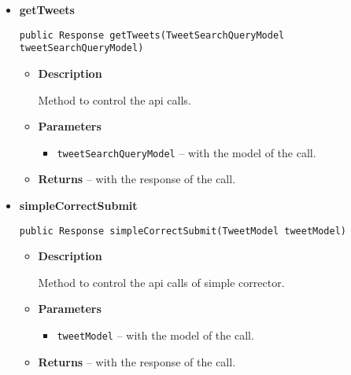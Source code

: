 {{{{{{{{{{\begin{itemize}
{\begin{itemize}
{Method to control the api calls of advanced corrector.
}
\item{
{\bf  Parameters}
  \begin{itemize}
   \item{
\texttt{tweetListModel} -- with the model of the call.}
  \end{itemize}
}%
\item{{\bf  Returns} -- 
with the response of the call. 
}%
\end{itemize}
}%
\item{ 
\hypertarget{com.jmorenov.tweetscweb.TweetCorrectorAPIController.getTweets(com.jmorenov.tweetscweb.TweetSearchQueryModel)}{{\bf  getTweets}\\}
\begin{lstlisting}[frame=none]
public Response getTweets(TweetSearchQueryModel tweetSearchQueryModel)\end{lstlisting} %
\begin{itemize}
\item{
{\bf  Description}

Method to control the api calls.
}
\item{
{\bf  Parameters}
  \begin{itemize}
   \item{
\texttt{tweetSearchQueryModel} -- with the model of the call.}
  \end{itemize}
}%
\item{{\bf  Returns} -- 
with the response of the call. 
}%
\end{itemize}
}%
\item{ 
\hypertarget{com.jmorenov.tweetscweb.TweetCorrectorAPIController.simpleCorrectSubmit(com.jmorenov.tweetscweb.TweetModel)}{{\bf  simpleCorrectSubmit}\\}
\begin{lstlisting}[frame=none]
public Response simpleCorrectSubmit(TweetModel tweetModel)\end{lstlisting} %
\begin{itemize}
\item{
{\bf  Description}

Method to control the api calls of simple corrector.
}
\item{
{\bf  Parameters}
  \begin{itemize}
   \item{
\texttt{tweetModel} -- with the model of the call.}
  \end{itemize}
}%
\item{{\bf  Returns} -- 
with the response of the call. 
}%
\end{itemize}
}%
\end{itemize}
}
}
}}}}}}}}
